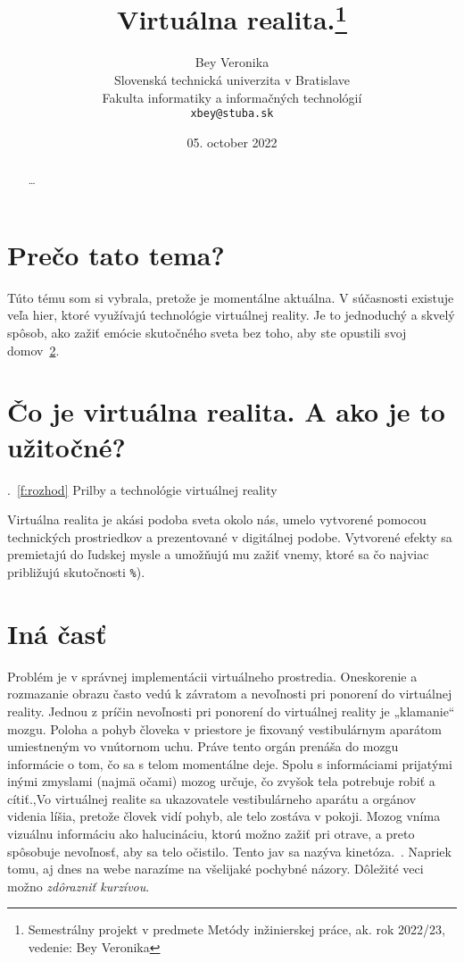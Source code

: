 \documentclass[10pt,twoside,slovak,a4paper]{article}
\title{Virtuálna realita.\thanks{Semestrálny projekt v predmete Metódy inžinierskej práce, ak. rok 2022/23, vedenie: Bey Veronika}} %
\author{Bey Veronika\\[2pt]
	{\small Slovenská technická univerzita v Bratislave}\\
	{\small Fakulta informatiky a informačných technológií}\\
	{\small \texttt{xbey@stuba.sk}}
	}
\date{\small 05. october 2022} %
\begin{document}
\maketitle

\begin{abstract}
\ldots
\end{abstract}



\section{Prečo tato tema?}


Túto tému som si vybrala, pretože je momentálne aktuálna. V súčasnosti existuje veľa hier, ktoré využívajú technológie virtuálnej reality. Je to jednoduchý a skvelý spôsob, ako zažiť emócie skutočného sveta bez toho, aby ste opustili svoj domov~\ref{nejaka}.



\section{Čo je virtuálna realita. A ako je to užitočné?} \label{nejaka}
.~\ref{f:rozhod} Prilby a technológie virtuálnej reality
\begin{figure*}[tbh]
\centering
Virtuálna realita je akási podoba sveta okolo nás, umelo vytvorené pomocou technických prostriedkov a prezentované v digitálnej podobe. Vytvorené efekty sa premietajú do ľudskej mysle a umožňujú mu zažiť vnemy, ktoré sa čo najviac približujú skutočnosti \texttt{\%}).
\label{f:rozhod}
\end{figure*}



\section{Iná časť} \label{ina}

 Problém je v správnej implementácii virtuálneho prostredia. Oneskorenie a rozmazanie obrazu často vedú k závratom a nevoľnosti pri ponorení do virtuálnej reality.  Jednou z príčin nevoľnosti pri ponorení do virtuálnej reality je „klamanie“ mozgu. Poloha a pohyb človeka v priestore je fixovaný vestibulárnym aparátom umiestneným vo vnútornom uchu. Práve tento orgán prenáša do mozgu informácie o tom, čo sa s telom momentálne deje. Spolu s informáciami prijatými inými zmyslami (najmä očami) mozog určuje, čo zvyšok tela potrebuje robiť a cítiť.\cite{Coplien:MPD},Vo virtuálnej realite sa ukazovatele vestibulárneho aparátu a orgánov videnia líšia, pretože človek vidí pohyb, ale telo zostáva v pokoji. Mozog vníma vizuálnu informáciu ako halucináciu, ktorú možno zažiť pri otrave, a preto spôsobuje nevoľnosť, aby sa telo očistilo. Tento jav sa nazýva kinetóza.~\cite{Czarnecki:Staged, Czarnecki:Progress}. Napriek tomu, aj dnes na webe narazíme na všelijaké pochybné názory\cite{PLP-Framework}. Dôležité veci možno \emph{zdôrazniť kurzívou}.
\end{document}
